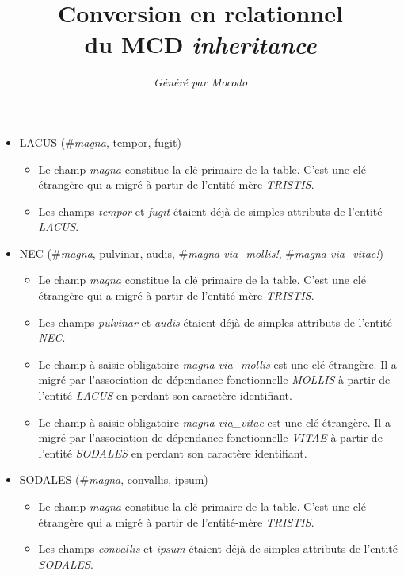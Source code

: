 \documentclass[a4paper]{article}
\title{Conversion en relationnel\\du MCD \emph{inheritance}}
\author{\emph{Généré par Mocodo}}
\newcommand{\relat}[1]{\textsc{#1}}
\newcommand{\attr}[1]{#1}
\newcommand{\prim}[1]{\uline{#1}}
\newcommand{\foreign}[1]{\#\textsl{#1}}
\begin{document}
\maketitle

\begin{itemize}
  \item \relat{LACUS} (\foreign{\prim{magna}}, \attr{tempor}, \attr{fugit})
  \begin{itemize}
    \item Le champ \emph{magna} constitue la clé primaire de la table. C'est une clé étrangère qui a migré à partir de l'entité-mère \emph{TRISTIS}.
    \item Les champs \emph{tempor} et \emph{fugit} étaient déjà de simples attributs de l'entité \emph{LACUS}.
  \end{itemize}

  \item \relat{NEC} (\foreign{\prim{magna}}, \attr{pulvinar}, \attr{audis}, \foreign{magna via_mollis!}, \foreign{magna via_vitae!})
  \begin{itemize}
    \item Le champ \emph{magna} constitue la clé primaire de la table. C'est une clé étrangère qui a migré à partir de l'entité-mère \emph{TRISTIS}.
    \item Les champs \emph{pulvinar} et \emph{audis} étaient déjà de simples attributs de l'entité \emph{NEC}.
    \item Le champ à saisie obligatoire \emph{magna via_mollis} est une clé étrangère. Il a migré par l'association de dépendance fonctionnelle \emph{MOLLIS} à partir de l'entité \emph{LACUS} en perdant son caractère identifiant.
    \item Le champ à saisie obligatoire \emph{magna via_vitae} est une clé étrangère. Il a migré par l'association de dépendance fonctionnelle \emph{VITAE} à partir de l'entité \emph{SODALES} en perdant son caractère identifiant.
  \end{itemize}

  \item \relat{SODALES} (\foreign{\prim{magna}}, \attr{convallis}, \attr{ipsum})
  \begin{itemize}
    \item Le champ \emph{magna} constitue la clé primaire de la table. C'est une clé étrangère qui a migré à partir de l'entité-mère \emph{TRISTIS}.
    \item Les champs \emph{convallis} et \emph{ipsum} étaient déjà de simples attributs de l'entité \emph{SODALES}.
  \end{itemize}


\end{itemize}
\end{document}
